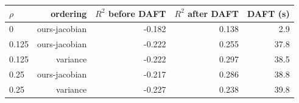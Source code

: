 \begin{tabular}{lrrrr}
\toprule
$\rho$ & ordering & $R^2$ before DAFT & $R^2$ after DAFT & DAFT (s) \\
\midrule
0 & ours-jacobian & -0.182 & 0.138 & 2.9 \\
0.125 & ours-jacobian & -0.222 & 0.255 & 37.8 \\
0.125 & variance & -0.222 & 0.297 & 38.5 \\
0.25 & ours-jacobian & -0.217 & 0.286 & 38.8 \\
0.25 & variance & -0.227 & 0.238 & 39.8 \\
\bottomrule
\end{tabular}
